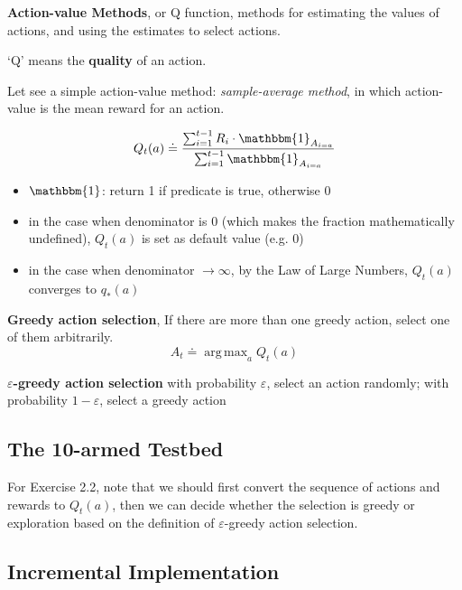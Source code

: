 \documentclass[lang=en,mode=geye,device=normal,color=blue,14pt]{elegantnote}
\DeclareMathOperator*{\1}{\mathbbm{1}}
\DeclareMathOperator*{\argmax}{arg\,max}
\begin{document}
\begin{definition}
\textbf{Action-value Methods}, or Q function, methods for estimating the values of actions, and using the estimates to select actions.
\end{definition}

`Q' means the \textbf{quality} of an action.

Let see a simple action-value method: \textit{sample-average method}, in which action-value is the mean reward for an action.

$$ Q_t(a) \doteq \frac{\sum_{i=1}^{t-1}R_i \cdot \1_{A_{i=a}}}{\sum_{i=1}^{t-1}\1_{A_{i=a}}}$$

\begin{itemize}
	\item $\1$: return 1 if predicate is true, otherwise 0
	\item in the case when denominator is 0 (which makes the fraction mathematically undefined), $Q_t(a)$ is set as default value (e.g. 0)
	\item in the case when denominator $\rightarrow \infty$, by the Law of Large Numbers, $Q_t(a)$ converges to $q_*(a)$
\end{itemize}

\begin{definition}
\textbf{Greedy action selection}, If there are more than one greedy action, select one of them arbitrarily.
$$ A_t \doteq \argmax_{a} Q_t(a) $$
\end{definition}

\begin{definition}
\textbf{$\varepsilon$-greedy action selection} with probability $\varepsilon$, select an action randomly; with probability $1-\varepsilon$, select a greedy action
\end{definition}

\subsection{The 10-armed Testbed}

For Exercise 2.2, note that we should first convert the sequence of actions and rewards to $Q_t(a)$, then we can decide whether the selection is greedy or exploration based on the definition of $\varepsilon$-greedy action selection.

\subsection{Incremental Implementation}
\end{document}
